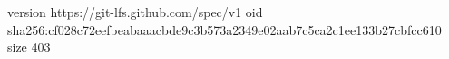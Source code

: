 version https://git-lfs.github.com/spec/v1
oid sha256:cf028c72eefbeabaaacbde9c3b573a2349e02aab7c5ca2c1ee133b27cbfcc610
size 403
